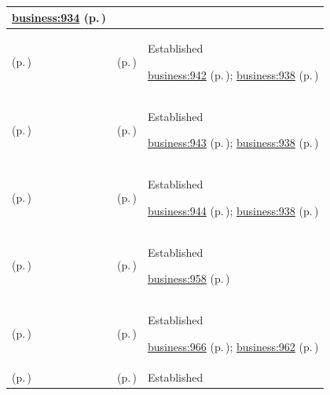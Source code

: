 \begin{longtable}{|>{\raggedright\arraybackslash}p{0.27\TableWidth}|>{\raggedright\arraybackslash}p{0.27\TableWidth}|>{\raggedright\arraybackslash}p{0.46\TableWidth}|}
 \hyperref[rad:business:934]{business:934} (p.\,\pageref{rad:business:934})\\\hline
\nameref{cap:bc-healthcare-organisation-service-structure-management} (p.\,\pageref{cap:bc-healthcare-organisation-service-structure-management}) & \nameref{cap:bc-healthcare-organisation-identity-structure-management} (p.\,\pageref{cap:bc-healthcare-organisation-identity-structure-management}) & Established

 \hyperref[rad:business:940]{business:942} (p.\,\pageref{rad:business:940}); \hyperref[rad:business:938]{business:938} (p.\,\pageref{rad:business:938})\\\hline
\nameref{cap:bc-healthcare-organisation-service-structure-management} (p.\,\pageref{cap:bc-healthcare-organisation-service-structure-management}) & \nameref{cap:bc-healthcare-location-definition-management} (p.\,\pageref{cap:bc-healthcare-location-definition-management}) & Established

 \hyperref[rad:business:940]{business:943} (p.\,\pageref{rad:business:940}); \hyperref[rad:business:938]{business:938} (p.\,\pageref{rad:business:938})\\\hline
\nameref{cap:bc-healthcare-organisation-service-structure-management} (p.\,\pageref{cap:bc-healthcare-organisation-service-structure-management}) & \nameref{cap:bc-healthcare-service-offering-management} (p.\,\pageref{cap:bc-healthcare-service-offering-management}) & Established

 \hyperref[rad:business:940]{business:944} (p.\,\pageref{rad:business:940}); \hyperref[rad:business:938]{business:938} (p.\,\pageref{rad:business:938})\\\hline
\nameref{cap:bc-corporate-resources-enterprise-services} (p.\,\pageref{cap:bc-corporate-resources-enterprise-services}) & \nameref{cap:bc-financial-commercial-services} (p.\,\pageref{cap:bc-financial-commercial-services}) & Established

 \hyperref[rad:business:958]{business:958} (p.\,\pageref{rad:business:958})\\\hline
\nameref{cap:bc-financial-commercial-services} (p.\,\pageref{cap:bc-financial-commercial-services}) & \nameref{cap:bc-clinical-activity-charging-information-provision} (p.\,\pageref{cap:bc-clinical-activity-charging-information-provision}) & Established

 \hyperref[rad:business:964]{business:966} (p.\,\pageref{rad:business:964}); \hyperref[rad:business:962]{business:962} (p.\,\pageref{rad:business:962})\\\hline
\nameref{cap:bc-corporate-resources-enterprise-services} (p.\,\pageref{cap:bc-corporate-resources-enterprise-services}) & \nameref{cap:bc-corporate-support-services} (p.\,\pageref{cap:bc-corporate-support-services}) & Established


\end{longtable}
